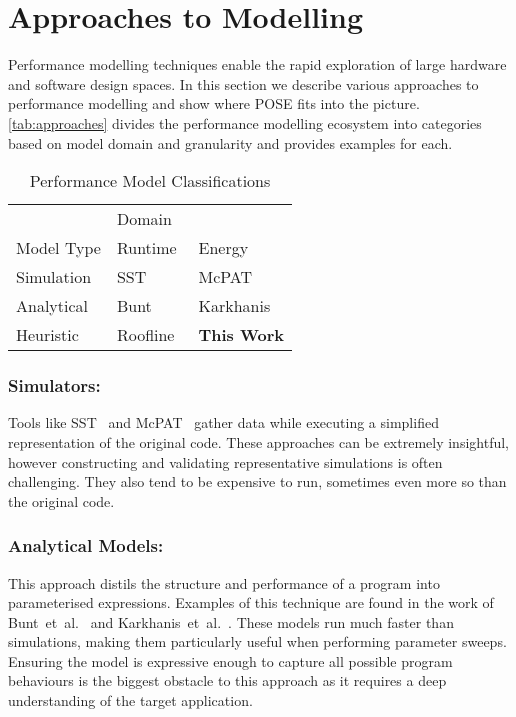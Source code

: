 \section{Approaches to Modelling}
\label{sec:approaches}
Performance modelling techniques enable the rapid exploration of large hardware and software design spaces.
In this section we describe various approaches to performance modelling and show where POSE fits into the picture.
\autoref{tab:approaches} divides the performance modelling ecosystem into categories based on model domain and granularity and provides examples for each.

\begin{table}
  \centering
  \caption{Performance Model Classifications}
  \setlength{\tabcolsep}{10pt}
  \begin{tabular}{lll}
  \toprule
    & \multicolumn{2}{l}{Domain}\\ \cmidrule(){2-3}
  Model Type  & Runtime & Energy \\
    \midrule
  Simulation & SST~\cite{rodrigues:2011aa} & McPAT~\cite{li:2009aa}  \\
  Analytical & Bunt~\cite{bunt:2013aa} & Karkhanis~\cite{karkhanis:2007aa} \\
  Heuristic & Roofline~\cite{williams:2009aa} & \textbf{This Work} \\
  \bottomrule
  \end{tabular}
  \label{tab:approaches}
\end{table}

\subsubsection{Simulators:} 
Tools like SST~\cite{rodrigues:2011aa} and McPAT~\cite{li:2009aa} gather data while executing a simplified representation of the original code.
These approaches can be extremely insightful, however constructing and validating representative simulations is often challenging.
They also tend to be expensive to run, sometimes even more so than the original code.

\subsubsection{Analytical Models:} This approach distils the structure and performance of a program into parameterised expressions.
Examples of this technique are found in the work of Bunt~et~al.~\cite{bunt:2013aa} and Karkhanis~et~al.~\cite{karkhanis:2007aa}.
These models run much faster than simulations, making them particularly useful when performing parameter sweeps.
Ensuring the model is expressive enough to capture all possible program behaviours is the biggest obstacle to this approach as it requires a deep understanding of the target application.

